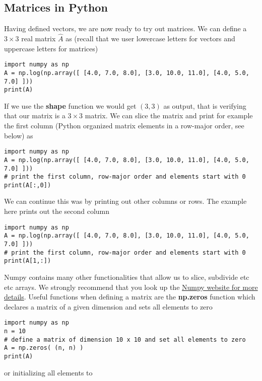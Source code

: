 \documentclass[%
oneside,                 %
final,                   %
10pt]{article}
\begin{document}
\subsection*{Matrices in Python}
Having defined vectors, we are now ready to try out matrices. We can define a $3 \times 3 $ real matrix $\hat{A}$
as (recall that we user lowercase letters for vectors and uppercase letters for matrices)
\begin{verbatim}
import numpy as np
A = np.log(np.array([ [4.0, 7.0, 8.0], [3.0, 10.0, 11.0], [4.0, 5.0, 7.0] ]))
print(A)
\end{verbatim}
If we use the \textbf{shape} function we would get $(3, 3)$ as output, that is verifying that our matrix is a $3\times 3$ matrix. We can slice the matrix and print for example the first column (Python organized matrix elements in a row-major order, see below) as
\begin{verbatim}
import numpy as np
A = np.log(np.array([ [4.0, 7.0, 8.0], [3.0, 10.0, 11.0], [4.0, 5.0, 7.0] ]))
# print the first column, row-major order and elements start with 0
print(A[:,0]) 
\end{verbatim}
We can continue this was by printing out other columns or rows. The example here prints out the second column
\begin{verbatim}
import numpy as np
A = np.log(np.array([ [4.0, 7.0, 8.0], [3.0, 10.0, 11.0], [4.0, 5.0, 7.0] ]))
# print the first column, row-major order and elements start with 0
print(A[1,:]) 
\end{verbatim}
Numpy contains many other functionalities that allow us to slice, subdivide etc etc arrays. We strongly recommend that you look up the \href{{http://www.numpy.org/}}{Numpy website for more details}. Useful functions when defining a matrix are the \textbf{np.zeros} function which declares a matrix of a given dimension and sets all elements to zero
\begin{verbatim}
import numpy as np
n = 10
# define a matrix of dimension 10 x 10 and set all elements to zero
A = np.zeros( (n, n) )
print(A) 
\end{verbatim}
or initializing all elements to 
\end{document}
